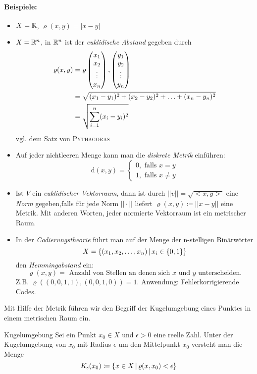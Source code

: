 \paragraph{Beispiele:}
\begin{itemize}
	\item $X=\mathbb{R}$, $\varrho(x,y)=|x-y|$
	\item $X=\mathbb{R}^n$, in $\mathbb{R}^n$ ist der \emph{euklidische Abstand} gegeben durch
	\begin{align*}
		\varrho(x,y)&=\varrho\vector{x_1\\x_2\\\vdots\\x_n},\vector{y_1\\y_2\\\vdots\\y_n}\\
								&=\sqrt{(x_1-y_1)^2+(x_2-y_2)^2+\ldots+(x_n-y_n)^2}\\
								&=\sqrt{\sum\limits^n_{i=1}(x_i-y_i)^2}
	\end{align*}
	vgl. dem Satz von \textsc{Pythagoras}
	\item Auf jeder nichtleeren Menge kann man die \emph{diskrete Metrik} einführen:
	\begin{equation*}
		\mathrm{d}(x,y)=\begin{cases}
			0, \text{ falls }x=y\\
			1, \text{ falls }x\neq y
		\end{cases}
	\end{equation*}
	\item Ist $V$ ein \emph{euklidischer Vektorraum}, dann ist durch $|\!|v|\!|=\sqrt{<\!x,y\!>}$ eine \emph{Norm} gegeben,falls für jede Norm $|\!|\cdot|\!|$ liefert $\varrho(x,y)\coloneqq |\!|x-y|\!|$ eine Metrik. Mit anderen Worten, jeder normierte Vektorraum ist ein metrischer Raum.
	\item In der \emph{Codierungstheorie} führt man auf der Menge der n-stelligen Binärwörter
	\begin{equation*}
		X=\left\{ (x_1,x_2,\ldots,x_n) \,\middle|\, x_i\in\left\{ 0,1 \right\} \right\}
	\end{equation*}
	den \emph{Hemmingabstand} ein:
	\begin{equation*}
		\varrho(x,y) =\text{ Anzahl von Stellen an denen sich $x$ und $y$ unterscheiden.}
	\end{equation*}
	Z.B. $\varrho((0,0,1,1),(0,0,1,0))=1$. Anwendung: Fehlerkorrigierende Codes.
\end{itemize}


Mit Hilfe der Metrik führen wir den Begriff der Kugelumgebung eines Punktes in einem metrischen Raum ein.
\begin{definition}{Kugelumgebung}
	Sei ein Punkt $x_0\in X$ und $\epsilon>0$ eine reelle Zahl. Unter der Kugelumgebung von $x_0$ mit Radius $\epsilon$ um den Mittelpunkt $x_0$ versteht man die Menge
	\begin{equation*}
		K_\epsilon(x_0)\coloneqq\left\{ x\in X \,\middle|\, \varrho(x,x_0)<\epsilon \right\}
	\end{equation*}
\end{definition}
